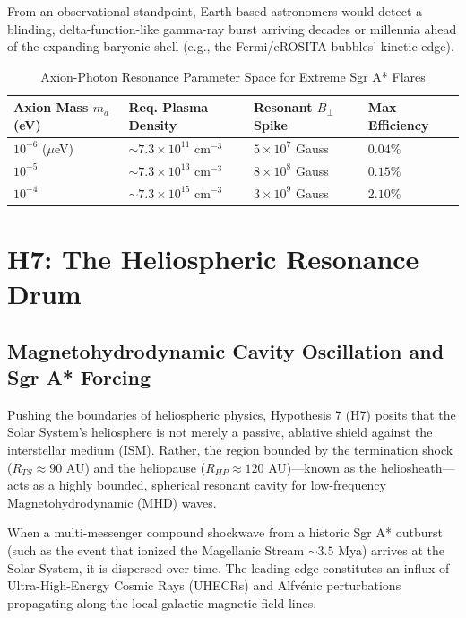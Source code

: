 \documentclass[12pt,a4paper]{article}
\begin{document}
From an observational standpoint, Earth-based astronomers would detect a blinding, delta-function-like gamma-ray burst arriving decades or millennia ahead of the expanding baryonic shell (e.g., the Fermi/eROSITA bubbles' kinetic edge). 

\begin{table}[h]
\centering
\caption{Axion-Photon Resonance Parameter Space for Extreme Sgr A* Flares}
\vspace{0.2cm}
\begin{tabular}{l l l l}
\toprule
\textbf{Axion Mass $m_a$ (eV)} & \textbf{Req. Plasma Density} & \textbf{Resonant $B_\perp$ Spike} & \textbf{Max Efficiency} \\
\midrule
$10^{-6}$ ($\mu$eV) & $\sim 7.3 \times 10^{11}$ cm$^{-3}$ & $5 \times 10^7$ Gauss & $0.04\%$ \\
$10^{-5}$ & $\sim 7.3 \times 10^{13}$ cm$^{-3}$ & $8 \times 10^8$ Gauss & $0.15\%$ \\
$10^{-4}$ & $\sim 7.3 \times 10^{15}$ cm$^{-3}$ & $3 \times 10^9$ Gauss & $2.10\%$ \\
\bottomrule
\end{tabular}
\end{table}

\newpage

\section{H7: The Heliospheric Resonance Drum}
\subsection{Magnetohydrodynamic Cavity Oscillation and Sgr A* Forcing}

Pushing the boundaries of heliospheric physics, Hypothesis 7 (H7) posits that the Solar System’s heliosphere is not merely a passive, ablative shield against the interstellar medium (ISM). Rather, the region bounded by the termination shock ($R_{TS} \approx 90$ AU) and the heliopause ($R_{HP} \approx 120$ AU)—known as the heliosheath—acts as a highly bounded, spherical resonant cavity for low-frequency Magnetohydrodynamic (MHD) waves. 

When a multi-messenger compound shockwave from a historic Sgr A* outburst (such as the event that ionized the Magellanic Stream $\sim 3.5$ Mya) arrives at the Solar System, it is dispersed over time. The leading edge constitutes an influx of Ultra-High-Energy Cosmic Rays (UHECRs) and Alfvénic perturbations propagating along the local galactic magnetic field lines. 
\end{document}

